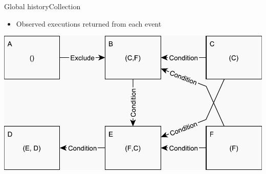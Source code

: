 \documentclass{beamer}
\begin{document}
\begin{frame}{Global history}{Collection}%
    \begin{itemize}
    	\item Observed executions returned from each event
    \end{itemize}
    \vspace{\fill}
    \centering
    \includegraphics[scale=0.5]{figures/inconsistent-cut.pdf}
\end{frame}
\end{document}
